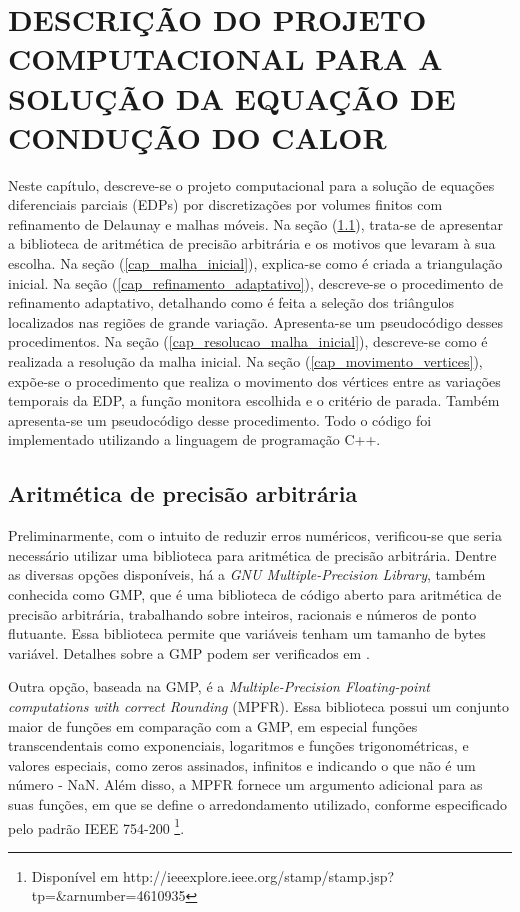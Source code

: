 \section{DESCRIÇÃO DO PROJETO COMPUTACIONAL PARA A SOLUÇÃO DA EQUAÇÃO DE CONDUÇÃO DO CALOR}
\label{cap:desenvolvimento}

Neste capítulo, descreve-se o projeto computacional para a solução de equações diferenciais parciais (EDPs) por discretizações por volumes finitos com refinamento de Delaunay e malhas móveis. Na seção (\ref{cap_aritmetica_precisão_arbitraria}), trata-se de apresentar a biblioteca de aritmética de precisão arbitrária e os motivos que levaram à sua escolha. Na seção (\ref{cap_malha_inicial}),  explica-se como é criada a triangulação inicial. Na seção (\ref{cap_refinamento_adaptativo}), descreve-se o procedimento de refinamento adaptativo, detalhando como é feita a seleção dos triângulos localizados nas regiões de grande variação. Apresenta-se um pseudocódigo desses procedimentos. Na seção (\ref{cap_resolucao_malha_inicial}), descreve-se como é realizada a resolução da malha inicial. Na seção (\ref{cap_movimento_vertices}), expõe-se o procedimento que realiza o movimento dos vértices entre as variações temporais da EDP, a função monitora escolhida e o critério de parada. Também apresenta-se um pseudocódigo desse procedimento. Todo o código foi implementado utilizando a linguagem de programação C++.

\subsection{Aritmética de precisão arbitrária}
\label{cap_aritmetica_precisão_arbitraria}

Preliminarmente, com o intuito de reduzir erros numéricos, verificou-se que seria necessário utilizar uma biblioteca para aritmética de precisão arbitrária. Dentre as diversas opções disponíveis, há a  {\it GNU Multiple-Precision Library}, também conhecida como GMP, que é uma biblioteca de código aberto para aritmética de precisão arbitrária, trabalhando sobre inteiros, racionais e números de ponto flutuante. Essa biblioteca permite que variáveis tenham um tamanho de bytes variável. Detalhes sobre a GMP podem ser verificados em . 

Outra opção, baseada na GMP, é a {\it Multiple-Precision Floating-point computations with correct Rounding} (MPFR). Essa biblioteca possui um conjunto maior de funções em comparação com a GMP, em especial funções transcendentais como exponenciais, logaritmos e funções trigonométricas, e valores especiais, como zeros assinados, infinitos e indicando o que não é um número - NaN. Além disso, a MPFR fornece um argumento adicional para as suas funções, em que se define o arredondamento utilizado, conforme especificado pelo padrão IEEE 754-200  \footnote{Disponível em http://ieeexplore.ieee.org/stamp/stamp.jsp?tp=\&arnumber=4610935 }. 


